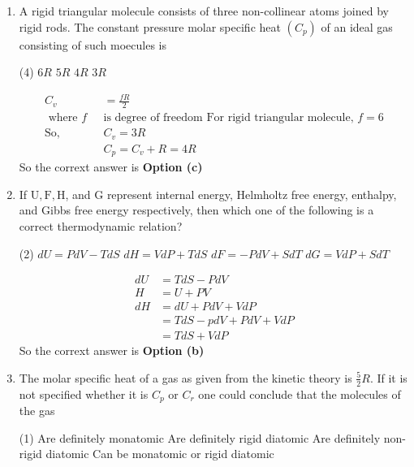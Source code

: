 \begin{enumerate}
\begin{answer}
\end{answer}
\item A rigid triangular molecule consists of three non-collinear atoms joined by rigid rods. The constant pressure molar specific heat $\left(C_{p}\right)$ of an ideal gas consisting of such moecules is
 \begin{tasks}(4)
	\task[\textbf{a.}] $6 R$
	\task[\textbf{b.}]$5 R$
	\task[\textbf{c.}] $4 R$
	\task[\textbf{d.}] $3 R$
\end{tasks}
\begin{answer}
	$$
	\begin{aligned}
	C_{v}&=\frac{f R}{2}\\
\text{	where $f$ }&\text{is degree of freedom
	For rigid triangular molecule, $f=6$}\\
\text{So,}\quad 
&C_{v}=3 R \\
&C_{p}=C_{v}+R=4 R
\end{aligned}
$$
So the corrext answer is \textbf{Option (c)}
\end{answer}
\item If $\mathrm{U}, \mathrm{F}, \mathrm{H}$, and $\mathrm{G}$ represent internal energy, Helmholtz free energy, enthalpy, and Gibbs free energy
respectively, then which one of the following is a correct thermodynamic relation?
 \begin{tasks}(2)
	\task[\textbf{a.}]$d U=P d V-T d S$
	\task[\textbf{b.}] $d H=V d P+T d S$
	\task[\textbf{c.}]$d F=-P d V+S d T$
	\task[\textbf{d.}]  $d G=V d P+S d T$
\end{tasks}
\begin{answer}
	$$
	\begin{aligned}
	d U &=T d S-P d V \\
	H &=U+P V \\
	d H &=d U+P d V+V d P \\
	&=T d S-p d V+P d V+V d P \\
	&=T d S+V d P
\end{aligned}
$$
So the corrext answer is \textbf{Option (b)}
\end{answer}
\item The molar specific heat of a gas as given from the kinetic theory is $\frac{5}{2} R$. If it is not specified whether it is $C_{p}$ or $C_{r}$ one could conclude that the molecules of the gas
 \begin{tasks}(1)
	\task[\textbf{a.}]Are definitely monatomic
	\task[\textbf{b.}]Are definitely rigid diatomic
	\task[\textbf{c.}]Are definitely non-rigid diatomic
	\task[\textbf{d.}]Can be monatomic or rigid diatomic

\end{tasks}
\end{enumerate}
